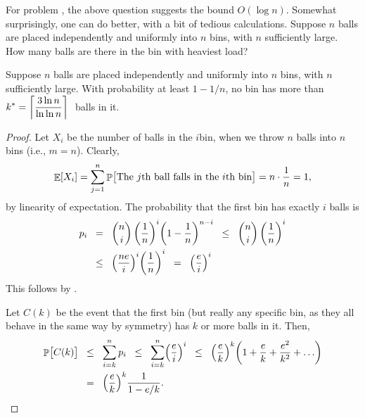For problem  , the above
question suggests the bound $O( \log n)$. Somewhat surprisingly, one can
do better, with a bit of tedious calculations.  Suppose $n$ balls are
placed independently and uniformly into $n$ bins, with $n$ sufficiently
large.  How many balls are there in the bin with heaviest load?


\begin{theorem}
    Suppose $n$ balls are placed independently and uniformly into
    $n$ bins, with $n$ sufficiently large.
    With probability at least $1- 1/n$, no bin has more than
    $\displaystyle k^* = \left\lceil {\frac{3\ln{n}}{\ln \ln n}} \right\rceil\;$ balls in
    it.
\end{theorem}
\begin{proof}
    Let $X_i$ be the number of balls in the $i$\th bin, when we throw $n$
    balls into $n$ bins (i.e., $m=n$). Clearly,
    \begin{equation*}
        \Ex{ X_i } = \sum_{j=1}^{n} \Prob{ \bigl. \text{The $j$\th
              ball falls in the $i$\th bin}} = n \cdot \frac{1}{n} = 1,
    \end{equation*}
    by linearity of expectation.  The probability that the first bin has
    exactly $i$ balls is
    \begin{align*}
        p_i
        &\EQ
        \binom{n}{i}\, \pth{\frac{1}{n}}^i \pth[]{ 1 -
      \frac{1}{n}}^{n-i}%
      \LEQ%
      \binom{n}{i}\, \pth[]{\frac{1}{n}}^i%
      \\&%
      \LEQ%
      \pth[]{\frac{n e}{i}}^i \pth[]{\frac{1}{n}}^i%
      \EQ%
      \pth[]{\frac{e}{i}}^{i}
    \end{align*}
    This follows by 
    .

    Let $C(k)$ be the event that the first bin (but really any specific
    bin, as they all behave in the same way by symmetry) has $k$ or more
    balls in it. Then,
    \begin{align*}
      \Prob{\bigl. C(k)}%
      &\LEQ%
      \sum_{i=k}^{n} p_i%
      \LEQ
      \sum_{i=k}^{n} \pth[]{\frac{e}{i}}^{i}%
      \LEQ%
      \pth[]{\frac{e}{k}}^{k} \pth{1 + \frac{e}{k} + \frac{e^2}{k^2} +
      \ldots }%
   \\&
   \EQ%
      \pth[]{\frac{e}{k}}^k \frac{1}{1-e/k}.
    \end{align*}


\end{proof}
